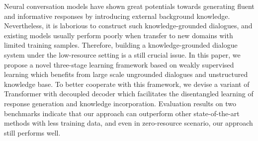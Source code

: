 Neural conversation models have shown great potentials towards generating fluent and informative responses by introducing external background knowledge. Nevertheless, it is laborious to construct such knowledge-grounded dialogues, and existing models usually perform poorly when transfer to new domains with limited training samples. Therefore, building a knowledge-grounded dialogue system under the low-resource setting is a still crucial issue. In this paper, we propose a novel three-stage learning framework  based on weakly supervised learning which benefits from large scale ungrounded dialogues and unstructured knowledge base. To better cooperate with this framework, we devise a variant of Transformer with decoupled decoder which facilitates the disentangled learning of response generation and knowledge incorporation. Evaluation results on two benchmarks indicate that our approach can outperform other state-of-the-art methods with less training data, and even in zero-resource scenario, our approach still performs well.
